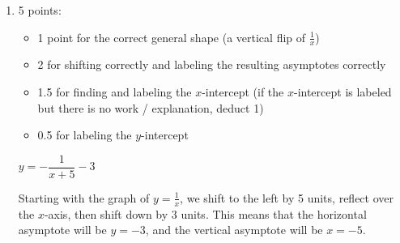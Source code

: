\documentclass{article}
\begin{document}
\begin{enumerate}
\begin{enumerate}
    \begin{problem}[\vfill]
      $y = \left| (x - 1)^2 - 4 \right|$
    \end{problem}

    \begin{solution}
      This function is the absolute value of the function in part (a). The portion of the
      graph of $y=(x-1)^2-4$ that was below the $x$-axis will be flipped above the $x$-axis. This
      means that the $y$-intercept will now be $3$, but the $x$-intercepts will stay the same,
      $-1$ and $3$.

    \end{solution}

  \item

    \begin{grading}
      5 points:
      \begin{itemize}[nosep]
      \item 1 point for the correct general shape (a vertical flip of $\frac{1}{x}$)
      \item 2 for shifting correctly and labeling the resulting asymptotes correctly
      \item 1.5 for finding and labeling the $x$-intercept (if the $x$-intercept is labeled but there is no work / explanation, deduct 1)
      \item 0.5 for labeling the $y$-intercept
      \end{itemize}
    \end{grading}

    \begin{problem}[\vfill\newpage]
      $y = - \dfrac{1}{x + 5} - 3$      
    \end{problem}

    \begin{solution}
      Starting with the graph of $y=\frac{1}{x}$, we shift to the left by 5 units, reflect
      over the $x$-axis, then shift down by 3 units. This means that the horizontal asymptote
      will be $y=-3$, and the vertical asymptote will be $x=-5$.


\end{solution}
\end{enumerate}
\end{enumerate}
\end{document}
